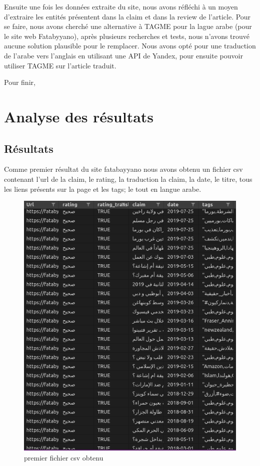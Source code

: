 \documentclass[oneside,13pt,a4paper]{report}
\begin{document}
Ensuite une fois les données extraite du site, nous avons réfléchi à un moyen d'extraire les entités présentent dans la claim et dans la review de l'article. Pour se faire, nous avons cherché une alternative à TAGME pour la lague arabe (pour le site web Fatabyyano), après plusieurs recherches et tests, nous n'avons trouvé aucune solution plausible pour le remplacer. Nous avons opté pour une traduction de l'arabe vers l'anglais en utilisant une API de Yandex, pour ensuite pouvoir utiliser TAGME sur l'article traduit.

Pour finir,

\chapter{Analyse des résultats}

\section{Résultats}
Comme premier résultat du site fatabayyano nous avons obtenu un fichier csv contenant l'url de la claim, le rating, la traduction la claim, la date, le titre, tous les liens présents sur la page et les tags; le tout en langue arabe.
\begin{figure}[h]
	\centering
	\begin{minipage}[c]{.5\linewidth}
		\includegraphics[width=1\textwidth]{img/fatab1.png}
		\caption{premier fichier csv obtenu}
	\end{minipage}
\end{figure}
\end{document}
